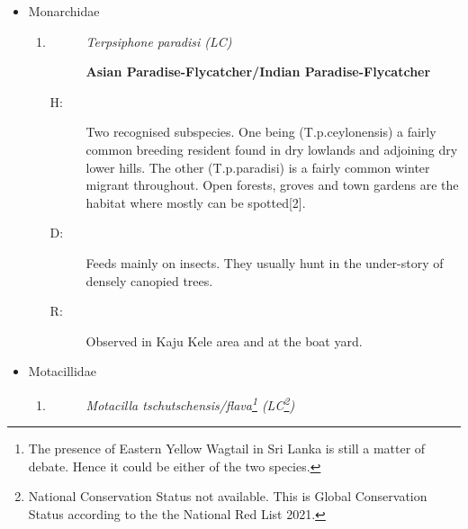 \begin{itemize}
\begin{enumerate}
\begin{description}
\item[]%
\textbf{Blue{-}tailed Bee{-}Eater}%
\end{description}%
\begin{description}%
\item[H: ]%
Fairly common winter migrants throughout the island. Small flocks do breed on eastern dry lowlands. Open areas and the forests are the preferred habitats{[}2{]}.%
\item[D: ]%
Primarily feeds on flying insects, with a particular focus on bees, wasps, butterflies and hornets. %
\item[R: ]%
University ground, around Sumanadasa building, Boat yard, open areas of Kaju Kele. Around the buildings/trees of  ENTC,  Dept. of Civil Engineering and Dept. of Architecture buildings.%
\end{description}%
\end{enumerate}%
\item%
Monarchidae%
\begin{enumerate}%
\item%
\begin{description}%
\item[]%
\textit{Terpsiphone paradisi (LC)}%
\item[]%
\textbf{Asian Paradise{-}Flycatcher/Indian Paradise{-}Flycatcher}%
\end{description}%
\begin{description}%
\item[H: ]%
Two recognised subspecies. One being (T.p.ceylonensis) a fairly common breeding resident found in dry lowlands and adjoining dry lower hills. The other (T.p.paradisi) is a fairly common winter migrant throughout. Open forests, groves and town gardens are the habitat where mostly can be spotted{[}2{]}.%
\item[D: ]%
Feeds mainly on insects.  They usually hunt in the under-story of densely canopied trees.%
\item[R: ]%
Observed in Kaju Kele area and at the boat yard.%
\end{description}%
\end{enumerate}%
\item%
Motacillidae%
\begin{enumerate}%
\item%
\begin{description}%
\item[]%
\textit{Motacilla tschutschensis/flava\footnote{The presence of Eastern Yellow Wagtail in Sri Lanka is still a matter of debate. Hence it could be either of the two species. } (LC\footnote{National Conservation Status not available. This is Global Conservation Status according to the the National Red List 2021.})}%

\end{description}
\end{enumerate}
\end{itemize}
